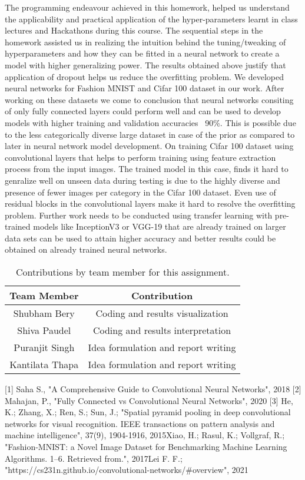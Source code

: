 \documentclass{article}
\begin{document}
The programming endeavour achieved in this homework, helped us understand the applicability and practical application of the hyper-parameters learnt in class lectures and Hackathons during this course. The sequential steps in the homework assisted us in realizing the intuition behind the tuning/tweaking of hyperparameters and how they can be fitted in a neural network to create a model with higher generalizing power. The results obtained above justify that application of dropout helps us reduce the overfitting problem. We developed neural networks for Fashion MNIST and Cifar 100 dataset in our work. After working on these datasets we come to conclusion that neural networks consiting of only fully connected layers could perform well and can be used to develop models with higher training and validation accuracies ~90\%. This is possible due to the less categorically diverse large dataset in case of the prior as compared to later in neural network model development. On training Cifar 100 dataset using convolutional layers that helps to perform training using feature extraction process from the input images. The trained model in this case, finds it hard to genralize well on unseen data during testing is due to the highly diverse and presence of fewer images per category in the Cifar 100 dataset. Even use of residual blocks in the convolutional layers make it hard to resolve the overfitting problem. Further work needs to be conducted  using transfer learning with pre-trained models like InceptionV3 or VGG-19 that are already trained on larger data sets can be used to attain higher accuracy and better results could be obtained on already trained neural networks.


\begin{table}[h]
    \caption{Contributions by team member for this assignment.}
    \centering
    \begin{tabular}{|c|c|} \hline
    {\bf Team Member}     &  {\bf Contribution}  \\ \hline
    Shubham Bery     &   Coding and results visualization \\
    Shiva Paudel     &   Coding and results interpretation \\
    Puranjit Singh   &   Idea formulation and report writing \\ 
    Kantilata Thapa  &   Idea formulation and report writing \\ \hline
    \end{tabular}
    \label{tab:contribution}
\end{table}



[1] Saha S., "A Comprehensive Guide to Convolutional Neural Networks", 2018
[2] Mahajan, P., "Fully Connected vs Convolutional Neural Networks", 2020
[3] He, K.; Zhang, X.; Ren, S.; Sun, J.; "Spatial pyramid pooling in deep convolutional networks for visual recognition. IEEE transactions on pattern analysis and machine intelligence", 37(9), 1904-1916, 2015\newline
[4] Xiao, H.; Rasul, K.; Vollgraf, R.; "Fashion-MNIST: a Novel Image Dataset for Benchmarking Machine Learning Algorithms. 1–6. Retrieved from.", 2017\newline
[5] Lei F. F.; "https://cs231n.github.io/convolutional-networks/#overview", 2021
 
\end{document}
